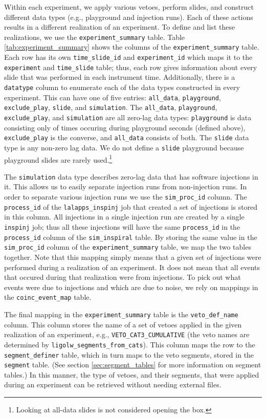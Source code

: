 Within each experiment, we apply various vetoes, perform slides, and construct different data types (e.g., playground and injection runs). Each of these actions results in a different realization of an experiment. To define and list these realizations, we use the \texttt{experiment\_summary} table. Table \ref{tab:experiment_summary} shows the columns of the \texttt{experiment\_summary} table. Each row has its own \texttt{time\_slide\_id} and \texttt{experiment\_id} which maps it to the \texttt{experiment} and \texttt{time\_slide} table; thus, each row gives information about every slide that was performed in each instrument time. Additionally, there is a \texttt{datatype} column to enumerate each of the data types constructed in every experiment. This can have one of five entries: \texttt{all\_data}, \texttt{playground}, \texttt{exclude\_play}, \texttt{slide}, and \texttt{simulation}. The \texttt{all\_data}, \texttt{playground}, \texttt{exclude\_play}, and \texttt{simulation} are all zero-lag data types: \texttt{playground} is data consisting only of times occuring during playground seconds (defined above), \texttt{exclude\_play} is the converse, and \texttt{all\_data} consists of both. The \texttt{slide} data type is any non-zero lag data. We do not define a \texttt{slide} playground because playground slides are rarely used.\footnote{Looking at all-data slides is not considered opening the box.}

The \texttt{simulation} data type describes zero-lag data that has software injections in it. This allows us to easily separate injection runs from non-injection runs. In order to separate various injection runs we use the \texttt{sim\_proc\_id} column. The \texttt{process\_id} of the \texttt{lalapps\_inspinj} job that created a set of injections is stored in this column. All injections in a single injection run are created by a single \texttt{inspinj} job; thus all these injections will have the same \texttt{process\_id} in the \texttt{process\_id} column of the \texttt{sim\_inspiral} table. By storing the same value in the \texttt{sim\_proc\_id} column of the \texttt{experiment\_summary} table, we map the two tables together. Note that this mapping simply means that a given set of injections were performed during a realization of an experiment. It does not mean that all events that occured during that realization were from injections. To pick out what events were due to injections and which are due to noise, we rely on mappings in the \texttt{coinc\_event\_map} table.

The final mapping in the \texttt{experiment\_summary} table is the \texttt{veto\_def\_name} column. This column stores the name of a set of vetoes applied in the given realization of an experiment, e.g., \texttt{VETO\_CAT3\_CUMULATIVE} (the veto names are determined by \texttt{ligolw\_segments\_from\_cats}). This column maps the row to the \texttt{segment\_definer} table, which in turn maps to the veto segments, stored in the \texttt{segment} table. (See section \ref{sec:segment_tables} for more information on segment tables.) In this manner, the type of vetoes, and their segments, that were applied during an experiment can be retrieved without needing external files.

